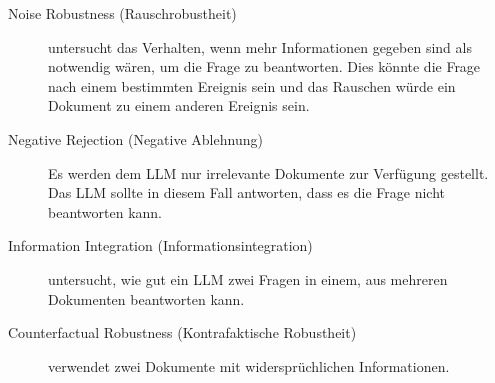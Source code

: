 \begin{description}
    \item [Noise Robustness (Rauschrobustheit)] untersucht das Verhalten, wenn mehr Informationen gegeben sind als notwendig wären, um die Frage zu beantworten.
    Dies könnte die Frage nach einem bestimmten Ereignis sein und das Rauschen würde ein Dokument zu einem anderen Ereignis sein.
    \item [Negative Rejection (Negative Ablehnung)] Es werden dem LLM nur irrelevante Dokumente zur Verfügung gestellt. Das LLM sollte in diesem Fall antworten, dass es die Frage nicht beantworten kann.
    \item [Information Integration (Informationsintegration)] untersucht, wie gut ein LLM zwei Fragen in einem, aus mehreren Dokumenten beantworten kann.
    \item [Counterfactual Robustness (Kontrafaktische Robustheit)] verwendet zwei Dokumente mit widersprüchlichen Informationen.
\end{description}